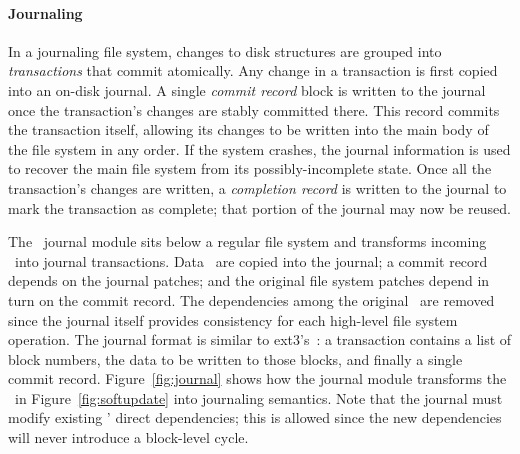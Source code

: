 
\paragraph{Journaling}
\label{sec:using:journal}

In a journaling file system, changes to disk structures are grouped into
\emph{transactions} that commit atomically.
%
Any change in a transaction is first copied into an on-disk journal.
%
A single \emph{commit record} block is written to the journal once the
transaction's changes are stably committed there.
%
This record commits the transaction itself, allowing its changes to be
written into the main body of the file system in any order.
%
If the system crashes, the journal information is used to recover the main
file system from its possibly-incomplete state.
%
Once all the transaction's changes are written, a \emph{completion record}
is written to the journal to mark the transaction as complete; that portion
of the journal may now be reused.

\begin{comment}
the journal point the transaction itself has the commit record
has been written, the changes (which collectively are called a
\emph{transaction}) are considered to have been made to the file system: if
the system crashes, the data from the journal will be copied into the main
file system as part of recovery. After the commit record has been written,
the original changes may be written in any order desired, and once they
have been written, the commit record may be erased and the portion of the
journal storing the data it referenced can be reused.
\end{comment}

The \Kudos\ journal module sits below a regular file system and transforms
incoming \patches\ into journal transactions.
%
Data \patches\ are copied into the journal; a commit record depends on the
journal patches; and the original file system patches depend in turn on the
commit record.
%
The dependencies among the original \patches\ are removed since the journal
itself provides consistency for each high-level file system operation.
%
The journal format is similar to ext3's~\cite{tweedie98journaling}: a
transaction contains a list of block numbers, the data to be written to
those blocks, and finally a single commit record.
%
Figure~\ref{fig:journal} shows how the journal module transforms the
\patches\ in Figure~\ref{fig:softupdate} into journaling semantics.
%
Note that the journal must modify existing \patches' direct dependencies;
this is allowed since the new dependencies will never introduce a
block-level cycle.

